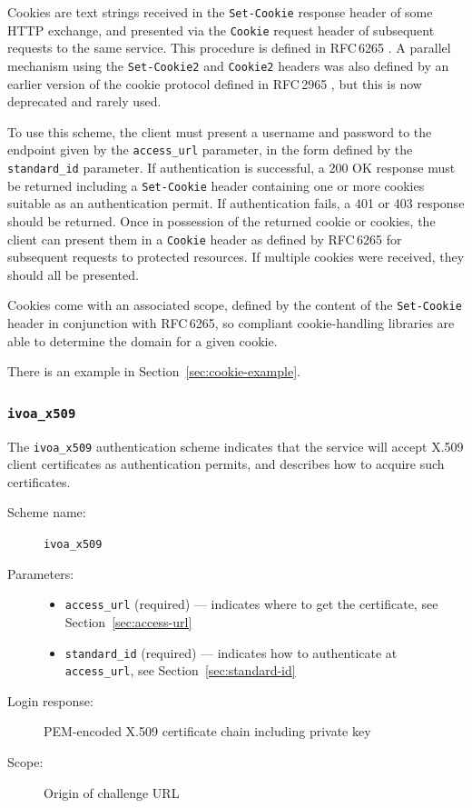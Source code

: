 \documentclass[11pt,a4paper]{ivoa}
\newcommand{\rfc}[1]{RFC\,#1}
\newcommand{\header}[1]{{\tt #1}}
\begin{document}
Cookies are text strings received in the {\tt Set-Cookie}
response header of some HTTP exchange,
and presented via the {\tt Cookie} request header of subsequent
requests to the same service.
This procedure is defined in \rfc{6265} \citep{std:RFC6265}.
A parallel mechanism using the {\tt Set-Cookie2} and {\tt Cookie2}
headers was also defined by an earlier version of the cookie protocol
defined in \rfc{2965} \citep{std:RFC2965},
but this is now deprecated and rarely used.

To use this scheme, the client must present a username and password
to the endpoint given by the \verb|access_url| parameter,
in the form defined by the \verb|standard_id| parameter.
If authentication is successful, a 200 OK response must be returned
including a \header{Set-Cookie} header containing one or more cookies
suitable as an authentication permit.
If authentication fails, a 401 or 403 response should be returned.
Once in possession of the returned cookie or cookies,
the client can present them in a \header{Cookie} header as defined
by \rfc{6265} for subsequent requests to protected resources.
If multiple cookies were received, they should all be presented.

Cookies come with an associated scope, defined by the content
of the \header{Set-Cookie} header in conjunction with \rfc{6265},
so compliant cookie-handling
libraries are able to determine the domain for a given cookie.

There is an example in Section~\ref{sec:cookie-example}.


\subsubsection{\mbox{\tt ivoa\_x509}}\label{sec:ivoa-x509}

The \verb|ivoa_x509| authentication scheme indicates that the service
will accept X.509 client certificates as authentication permits,
and describes how to acquire such certificates.

\begin{description}
  \item[Scheme name:] \verb|ivoa_x509|
  \item[Parameters:] \mbox{}
  \begin{itemize}
    \item \verb|access_url| (required) ---
          indicates where to get the certificate,
          see Section~\ref{sec:access-url}
    \item \verb|standard_id| (required) ---
          indicates how to authenticate at \verb|access_url|,
          see Section~\ref{sec:standard-id}
  \end{itemize}
  \item[Login response:] PEM-encoded X.509 certificate chain
                         including private key
  \item[Scope:] Origin of challenge URL
\end{description}
\end{document}
